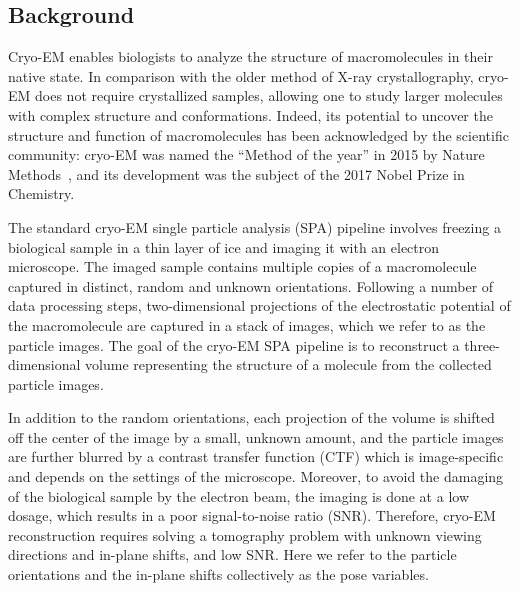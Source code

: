 \documentclass{article}
\begin{document}
\subsection{Background}
Cryo-EM enables biologists to analyze the structure of macromolecules in their native state.
In comparison with the older method of X-ray crystallography, cryo-EM does not require crystallized samples, allowing one to study larger molecules with complex structure and conformations.
Indeed, its potential to uncover the structure and function of macromolecules has been acknowledged by the scientific community: cryo-EM was named the ``Method of the year'' in 2015 by Nature Methods~\cite{noauthor_method_2016}, and its development was the subject of the 2017 Nobel Prize in Chemistry.

The standard cryo-EM single particle analysis (SPA) pipeline involves freezing  a biological sample in a thin layer of ice and imaging it with an electron microscope.
The imaged sample contains multiple copies of a macromolecule captured in distinct,  random and unknown orientations.
Following a number of data processing steps, two-dimensional projections of the electrostatic potential of the macromolecule are captured in a stack of images, which we refer to as the particle images. 
The goal of the cryo-EM SPA pipeline is to reconstruct a three-dimensional volume representing the structure of a molecule from the collected particle images.

In addition to the random orientations, each projection of the volume is shifted off the center of the image by a small, unknown amount, and the particle images are further blurred by a contrast transfer function (CTF) which is image-specific and depends on the settings of the microscope.
Moreover, to avoid the damaging of the biological sample by the electron beam, the imaging is done at a low dosage, which results in a poor signal-to-noise ratio (SNR).
Therefore, cryo-EM reconstruction requires solving a tomography problem with unknown viewing directions and in-plane shifts, and low SNR.
Here we refer to the particle orientations and the in-plane shifts collectively as the pose variables.
\end{document}
